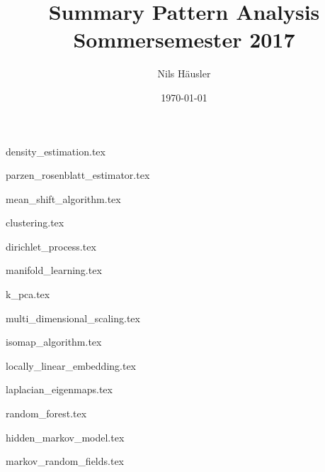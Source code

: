\documentclass[12p]{article}
\title{Summary Pattern Analysis\\ Sommersemester 2017}
\author{Nils Häusler}
\date{\today}
\begin{document}
\begin{titlepage}
  \maketitle
  \thispagestyle{empty}
\end{titlepage}

\newpage
{density_estimation.tex}

\newpage
{parzen_rosenblatt_estimator.tex}

\newpage
{mean_shift_algorithm.tex}

\newpage
{clustering.tex}

\newpage
{dirichlet_process.tex}

\newpage
{manifold_learning.tex}

\newpage
{k_pca.tex}

\newpage
{multi_dimensional_scaling.tex}

\newpage
{isomap_algorithm.tex}

\newpage
{locally_linear_embedding.tex}

\newpage
{laplacian_eigenmaps.tex}

\newpage
{random_forest.tex}

\newpage
{hidden_markov_model.tex}

\newpage
{markov_random_fields.tex}
\end{document}
